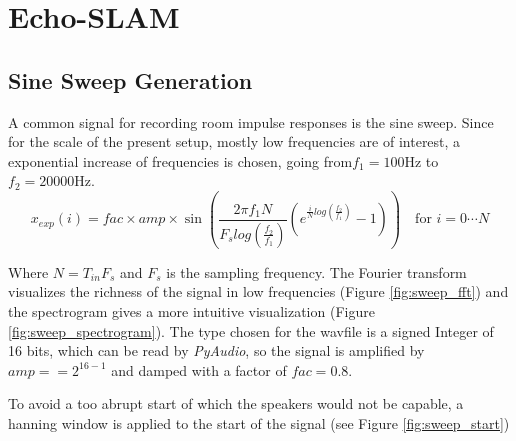 \section{Echo-SLAM}

\subsection{Sine Sweep Generation}

A common signal for recording room impulse responses is the sine sweep. 
Since for the scale of the present setup, mostly low frequencies are of interest, a exponential increase of frequencies is chosen, going from$f_1=100 \text{Hz}$ to $f_2=20000 \text{Hz}$. 
\begin{equation}
    x_{exp}(i) = fac \times amp \times \sin(\frac{2 \pi f_1 N}{F_s log(\frac{f_2}{f_1})}  (e^{\frac{i}{N}log(\frac{f_2}{f_1})} - 1)) \quad \text{for $i = 0 \cdots N$}
    \label{}
\end{equation}

Where $N=T_{in}F_s$ and $F_s$ is the sampling frequency. The Fourier transform visualizes the richness of the signal in low frequencies (Figure \ref{fig:sweep_fft}) and the spectrogram gives a more intuitive visualization (Figure \ref{fig:sweep_spectrogram}).
The type chosen for the wavfile is a signed Integer of 16 bits, which can be read by \textit{PyAudio}, so the signal is amplified by $amp==2^{16-1}$ and damped with a factor of $fac=0.8$. 

To avoid a too abrupt start of which the speakers would not be capable, a hanning window is applied to the start of the signal (see Figure \ref{fig:sweep_start})

